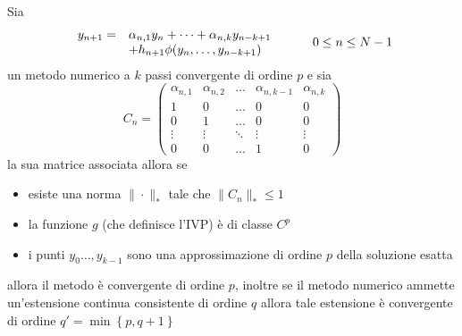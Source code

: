 \begin{thm}
Sia 
$$
\begin{array}{c lc}
y_{n+1} =	&	 \alpha_{n,1} y_n + \dots +\alpha_{n,k} y_{n-k+1} \\
		&	+ h_{n+1} \phi (y_n, \dots , y_{n-k+1})
\end{array}
\hspace{1cm}
0 \le n \le N-1
$$
un metodo numerico a $k$ passi convergente di ordine $p$ e sia
$$
C_n=
\begin{pmatrix}
 \alpha_{n,1}	&	\alpha_{n,2}	&	\dots	&	\alpha_{n,k-1}	&	\alpha_{n,k}	\\
      1		&		0	&	\dots	&		0	&		0	\\
      0		&		1	&	\dots	&		0	&		0	\\
      \vdots	&	\vdots		&	\ddots	&	\vdots		&	\vdots		\\
      0		&		0	&	\dots	&		1	&		0
\end{pmatrix}
$$
la sua matrice associata allora se
\begin{itemize}
 \item esiste una norma $\| \cdot \|_{*}$ tale che $\| C_n \|_{*} \le 1$
 \item la funzione $g$ (che definisce l'IVP) è di classe $C^p$
 \item i punti $y_0 \dots , y_{k-1}$ sono una approssimazione di ordine $p$ della soluzione esatta
\end{itemize}
allora il metodo è convergente di ordine $p$, inoltre se il metodo numerico ammette un'estensione 
continua consistente di ordine $q$ allora tale estensione è convergente di ordine 
$q'=\min \left \{ p , q+1 \right \} $
\end{thm}

